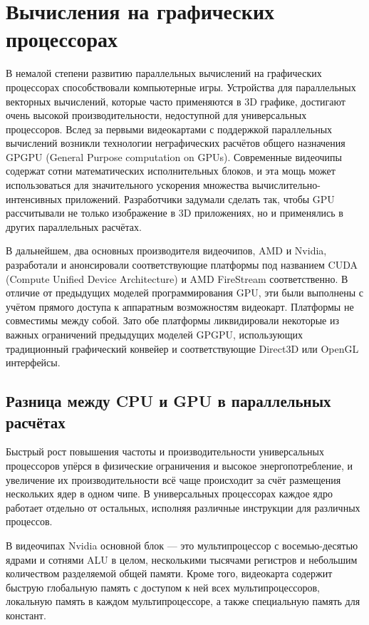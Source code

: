 \section {Вычисления на графических процессорах}

В немалой степени развитию параллельных вычислений на графических процессорах способствовали компьютерные игры. Устройства для параллельных векторных вычислений, которые часто применяются в 3D графике, достигают очень высокой производительности, недоступной для универсальных процессоров. Вслед за первыми видеокартами с поддержкой параллельных вычислений возникли технологии неграфических расчётов общего назначения GPGPU (General Purpose computation on GPUs). Современные видеочипы содержат сотни математических исполнительных блоков, и эта мощь может использоваться для значительного ускорения множества вычислительно-интенсивных приложений. Разработчики задумали сделать так, чтобы GPU рассчитывали не только изображение в 3D приложениях, но и применялись в других параллельных расчётах.

В дальнейшем, два основных производителя видеочипов, AMD и Nvi\-dia, разработали и анонсировали соответствующие платформы под названием CUDA (Compute Unified Device Architecture) и AMD FireStream соответственно. В отличие от предыдущих моделей программирования GPU, эти были выполнены с учётом прямого доступа к аппаратным возможностям видеокарт. Платформы не совместимы между собой. Зато обе платформы ликвидировали некоторые из важных ограничений предыдущих моделей GPGPU, использующих традиционный графический конвейер и соответствующие Direct3D или OpenGL интерфейсы.

\subsection {Разница между CPU и GPU в параллельных расчётах}

Быстрый рост повышения частоты и производительности универсальных процессоров упёрся в физические ограничения и высокое энергопотребление, и увеличение их производительности всё чаще происходит за счёт размещения нескольких ядер в одном чипе. В универсальных процессорах каждое ядро работает отдельно от остальных, исполняя различные инструкции для различных процессов.

В видеочипах Nvidia основной блок — это мультипроцессор с восемью-десятью ядрами и сотнями ALU в целом, несколькими тысячами регистров и небольшим количеством разделяемой общей памяти. Кроме того, видеокарта содержит быструю глобальную память с доступом к ней всех мультипроцессоров, локальную память в каждом мультипроцессоре, а также специальную память для констант.

